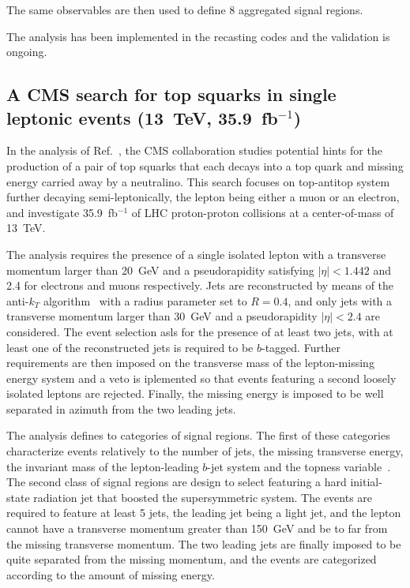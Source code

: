 \documentclass[11pt]{cernrep}
\begin{document}
The same observables are then used to define 8 aggregated signal regions.

The analysis has been implemented 
in the recasting codes and the validation is ongoing.

\subsection{A CMS search for top squarks in single leptonic events (13~TeV,
  35.9~fb$^{-1}$)}

In the analysis of Ref.~\cite{Sirunyan:2017xse}, the CMS collaboration studies
potential hints for the production of a pair of top squarks that each decays
into a top quark and missing energy carried away by a neutralino. This search
focuses on top-antitop system further decaying semi-leptonically, the lepton
being either a muon or an electron, and investigate 35.9~fb$^{-1}$ of LHC
proton-proton collisions at a center-of-mass of 13~TeV.

The analysis requires the presence of a single isolated lepton with a transverse
momentum larger than 20~GeV and a pseudorapidity satisfying $|\eta| < 1.442$ and
2.4 for electrons and muons respectively. Jets are reconstructed by means of the
anti-$k_T$ algorithm~\cite{Cacciari:2008gp} with a radius parameter set to
$R=0.4$, and only jets with a transverse momentum larger than 30~GeV and a
pseudorapidity $|\eta| < 2.4$ are considered. The event selection asls for the
presence of at least two jets, with at least one of the reconstructed
jets is required to be $b$-tagged. Further requirements are then imposed on the
transverse mass of the lepton-missing energy system and a veto is iplemented so
that events featuring a second loosely isolated leptons are rejected. Finally,
the missing energy is imposed to be well separated in azimuth from the two
leading jets.

The analysis defines to categories of signal regions. The first of these
categories characterize events relatively to the number of jets, the missing
transverse energy, the invariant mass of the lepton-leading $b$-jet system and
the topness variable~\cite{Graesser:2012qy}. The second class of signal regions are
design to select featuring a hard initial-state radiation jet that boosted the
supersymmetric system. The events are required to feature at least 5 jets, the
leading jet being a light jet, and the lepton cannot have a transverse momentum
greater than 150~GeV and be to far from the missing transverse momentum. The
two leading jets are finally imposed to be quite separated from the missing
momentum, and the events are categorized according to the amount of missing
energy.
\end{document}
